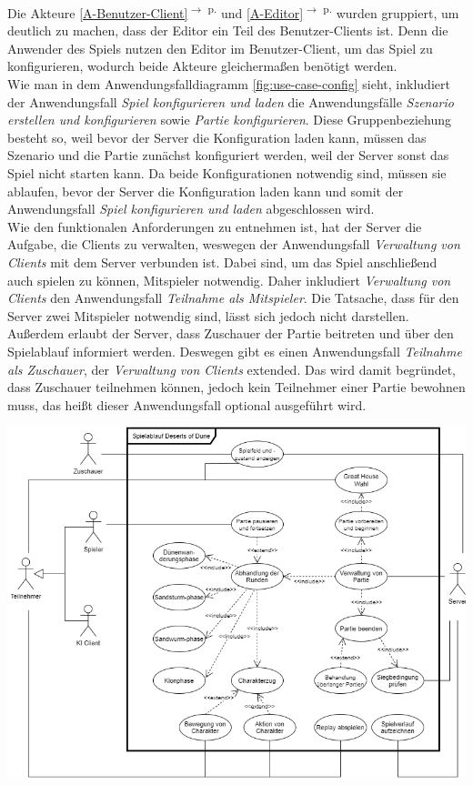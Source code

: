 \documentclass[12pt]{article}
\newcounter{fa}
\newcommand{\rref}[1]{\ref{#1}\textsuperscript{$\rightarrow$ p. \pageref{#1}}}
\begin{document}
Die Akteure \rref{A-Benutzer-Client} und \rref{A-Editor} wurden gruppiert, um deutlich zu machen, dass der Editor ein Teil des Benutzer-Clients ist. Denn die Anwender des Spiels nutzen den Editor im Benutzer-Client, um das Spiel zu konfigurieren, wodurch beide Akteure gleichermaßen benötigt werden. \\ Wie man in dem Anwendungsfalldiagramm \autoref{fig:use-case-config} sieht, inkludiert der Anwendungsfall \textit{Spiel konfigurieren und laden} die Anwendungsfälle \textit{Szenario erstellen und konfigurieren} sowie \textit{Partie konfigurieren}. Diese Gruppenbeziehung besteht so, weil bevor der Server die Konfiguration laden kann, müssen das Szenario und die Partie zunächst konfiguriert werden, weil der Server sonst das Spiel nicht starten kann. Da beide Konfigurationen notwendig sind, müssen sie ablaufen, bevor der Server die Konfiguration laden kann und somit der Anwendungsfall \textit{Spiel konfigurieren und laden} abgeschlossen wird. \\ Wie den funktionalen Anforderungen zu entnehmen ist, hat der Server die Aufgabe, die Clients zu verwalten, weswegen der Anwendungsfall \textit{Verwaltung von Clients} mit dem Server verbunden ist. Dabei sind, um das Spiel anschließend auch spielen zu können, Mitspieler notwendig. Daher inkludiert \textit{Verwaltung von Clients} den Anwendungsfall \textit{Teilnahme als Mitspieler}. Die Tatsache, dass für den Server zwei Mitspieler notwendig sind, lässt sich jedoch nicht darstellen. Außerdem erlaubt der Server, dass Zuschauer der Partie beitreten und über den Spielablauf informiert werden. Deswegen gibt es einen Anwendungsfall \textit{Teilnahme als Zuschauer}, der \textit{Verwaltung von Clients} extended. Das wird damit begründet, dass Zuschauer teilnehmen können, jedoch kein Teilnehmer einer Partie bewohnen muss, das heißt dieser Anwendungsfall optional ausgeführt wird. 

\centering
\includegraphics[width=\textwidth]{images/Anwendungsfalldiagramm_Spielablauf}
\label{fig:use-case-gameflow}
\end{document}
